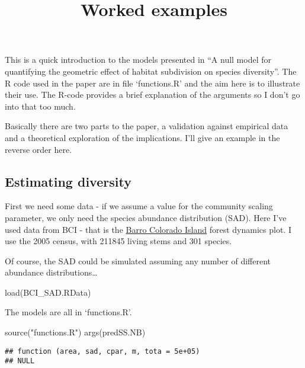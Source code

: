 \documentclass[
]{article}
\title{Worked examples}
\author{}
\date{\vspace{-2.5em}}
\newenvironment{Shaded}{\begin{snugshade}}{\end{snugshade}}
\newcommand{\FunctionTok}[1]{\textcolor[rgb]{0.00,0.00,0.00}{#1}}
\newcommand{\NormalTok}[1]{#1}
\newcommand{\StringTok}[1]{\textcolor[rgb]{0.31,0.60,0.02}{#1}}
\begin{document}
\maketitle

This is a quick introduction to the models presented in ``A null model
for quantifying the geometric effect of habitat subdivision on species
diversity''. The R code used in the paper are in file `functions.R' and
the aim here is to illustrate their use. The R-code provides a brief
explanation of the arguments so I don't go into that too much.

Basically there are two parts to the paper, a validation against
empirical data and a theoretical exploration of the implications. I'll
give an example in the reverse order here.

\hypertarget{estimating-diversity}{%
\subsection{Estimating diversity}\label{estimating-diversity}}

First we need some data - if we assume a value for the community scaling
parameter, we only need the species abundance distribution (SAD). Here
I've used data from BCI - that is the
\href{https://repository.si.edu/handle/10088/20925}{Barro Colorado
Island} forest dynamics plot. I use the 2005 census, with 211845 living
stems and 301 species.

Of course, the SAD could be simulated assuming any number of different
abundance distributions\ldots{}

\begin{Shaded}
\begin{Highlighting}[]
\FunctionTok{load}\NormalTok{(}\StringTok{\textquotesingle{}BCI\_SAD.RData\textquotesingle{}}\NormalTok{)}
\end{Highlighting}
\end{Shaded}

The models are all in `functions.R'.

\begin{Shaded}
\begin{Highlighting}[]
\FunctionTok{source}\NormalTok{(}\StringTok{"functions.R"}\NormalTok{)}
\FunctionTok{args}\NormalTok{(predSS.NB)}
\end{Highlighting}
\end{Shaded}

\begin{verbatim}
## function (area, sad, cpar, m, tota = 5e+05) 
## NULL
\end{verbatim}
\end{document}
